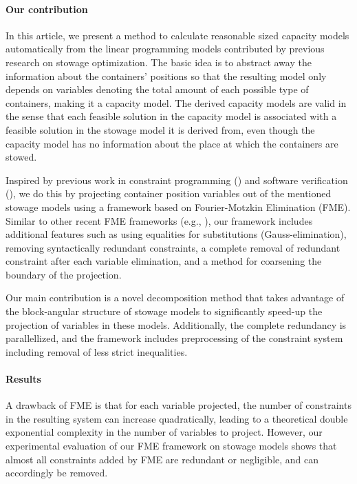 \paragraph{Our contribution}
In this article, we present a method to calculate reasonable sized capacity models automatically from the linear programming models contributed by previous research on stowage optimization. The basic idea is to abstract away the information about the containers' positions so that the resulting model only depends on variables denoting the total amount of each possible type of containers, making it a capacity model. {The derived capacity models are valid in the sense that each feasible solution in the capacity model is associated with a feasible solution in the stowage model it is derived from, even though the capacity model has no information about the place at which the containers are stowed.}

Inspired by previous work in constraint programming (\cite{lassez90}) and software verification (\cite{benoy05}), we do this by projecting container position variables out of the mentioned stowage models using a framework based on Fourier-Motzkin Elimination (FME). 
Similar to other recent FME frameworks (e.g., \cite{simon05,lukatskii08,shapot12}), our framework includes additional features such as using equalities for substitutions (Gauss-elimination), removing syntactically redundant constraints, a complete removal of redundant constraint after each variable elimination, and a method for coarsening the boundary of the projection. 

Our main contribution is a novel decomposition method that takes advantage of the block-angular structure of stowage models to significantly speed-up the projection of variables in these models. Additionally, the complete redundancy is parallellized, %
and the framework includes preprocessing of the constraint system including removal of less strict inequalities.

\paragraph{Results}
A drawback of FME is that for each variable projected, the number of constraints in the resulting system can increase quadratically, leading to a theoretical double exponential complexity in the number of variables to project. However, our experimental evaluation of our FME framework on stowage models shows that almost all constraints added by FME are redundant or negligible, and can accordingly be removed. 


